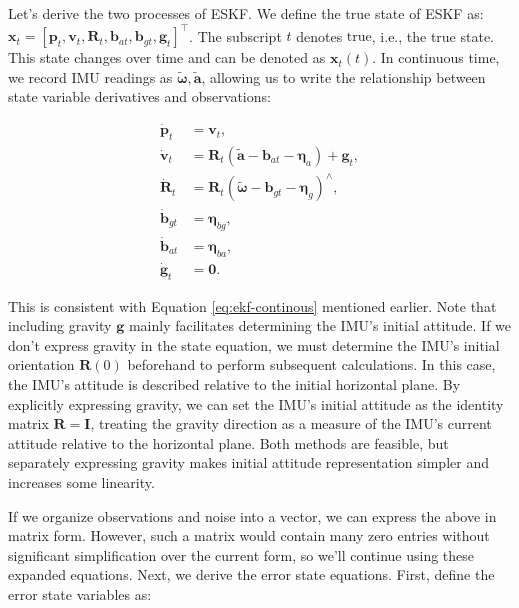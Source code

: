 Let's derive the two processes of ESKF. We define the true state of ESKF as: $\mathbf{x}_t = [\mathbf{p}_t, \mathbf{v}_t, \mathbf{R}_t, \mathbf{b}_{at}, \mathbf{b}_{gt}, \mathbf{g}_t]^\top$. The subscript $t$ denotes $\text{true}$, i.e., the true state. This state changes over time and can be denoted as $\mathbf{x}_t(t)$. In continuous time, we record IMU readings as $\tilde{\boldsymbol{\omega}}, \tilde{\mathbf{a}}$, allowing us to write the relationship between state variable derivatives and observations:

\begin{subequations}\label{eq:eskf-true-state}
	\begin{align}
		\dot{\mathbf{p}}_t &= \mathbf{v}_t, \\
		\dot{\mathbf{v}}_t &= \mathbf{R}_t (\tilde{\mathbf{a}} - \mathbf{b}_{at} - \boldsymbol{\eta}_a) + \mathbf{g}_t, \\
		\dot{\mathbf{R}}_t &= \mathbf{R}_t \left( \tilde{\boldsymbol{\omega}} - \mathbf{b}_{gt} - \boldsymbol{\eta}_g \right)^\wedge, \\
		\dot{\mathbf{b}}_{gt} &= \boldsymbol{\eta}_{bg}, \\
		\dot{\mathbf{b}}_{at} &= \boldsymbol{\eta}_{ba}, \\ 
		\dot{\mathbf{g}}_t &= \mathbf{0}.
	\end{align}
\end{subequations}

This is consistent with Equation \eqref{eq:ekf-continous} mentioned earlier. Note that including gravity $\mathbf{g}$ mainly facilitates determining the IMU's initial attitude. If we don't express gravity in the state equation, we must determine the IMU's initial orientation $\mathbf{R}(0)$ beforehand to perform subsequent calculations. In this case, the IMU's attitude is described relative to the initial horizontal plane. By explicitly expressing gravity, we can set the IMU's initial attitude as the identity matrix $\mathbf{R}=\mathbf{I}$, treating the gravity direction as a measure of the IMU's current attitude relative to the horizontal plane. Both methods are feasible, but separately expressing gravity makes initial attitude representation simpler and increases some linearity\cite{Lupton2009}.

If we organize observations and noise into a vector, we can express the above in matrix form. However, such a matrix would contain many zero entries without significant simplification over the current form, so we'll continue using these expanded equations. Next, we derive the error state equations. First, define the error state variables as:

